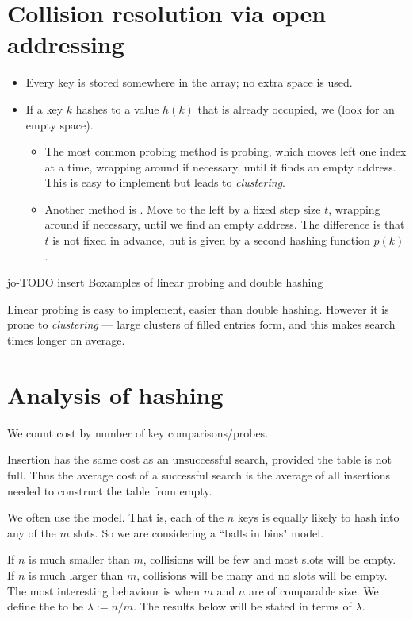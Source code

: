 \section*{Collision resolution via open addressing}
\begin{itemize}
\item Every key is stored somewhere in the array; no extra space is used.
\item If a key  $k$ hashes to a value $h(k)$ that is already occupied, 
we  (look for an empty space). 
	\begin{itemize}
		\item The most common probing method is  probing, which moves left
		 one index at a time, wrapping around if necessary, until it finds an empty 
		 address. This is easy to implement but leads to \emph{clustering}.
		\item Another method is . Move to the left by a
		fixed step size $t$, wrapping around if necessary, until we find an
		empty address. The difference is that $t$ is not fixed in advance, but
		is given by a second hashing function $p(k)$.
	\end{itemize}
\end{itemize}

jo-TODO insert Boxamples of linear probing and double hashing 


Linear probing is easy to implement, easier than double hashing.
However it is prone to \emph{clustering} --- large clusters of filled entries form, and this makes search times longer on average.



\section*{Analysis of hashing}

We count cost by number of key comparisons/probes.

Insertion has the same cost as an unsuccessful search, provided the table 
is not full. Thus the average cost of a successful search is the average of all insertions
 needed to construct the table from empty.

We often use the  model. That is, each of 
the $n$ keys is equally likely to hash into any of the $m$ slots. So we are 
considering a ``balls in bins" model.

If $n$ is much smaller than $m$, collisions will be few and most slots 
will be empty. If $n$ is much larger than $m$, collisions will be many and no 
slots will be empty. The most interesting behaviour is when $m$ and $n$ are 
of comparable size. We define the  to be $\lambda := n/m$. The results below 
will be stated in terms of $\lambda$.


